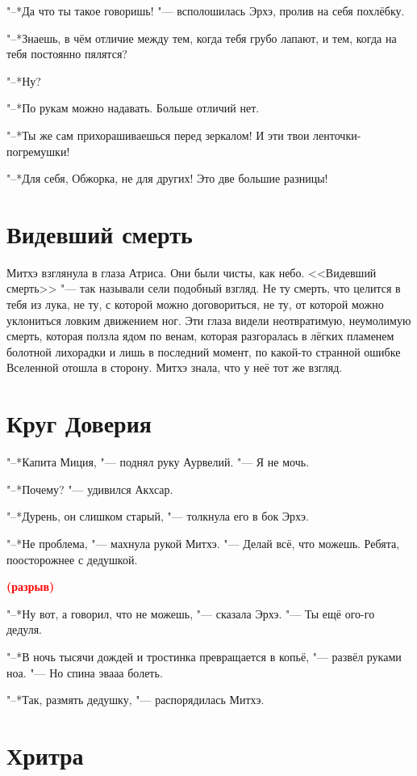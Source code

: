 \documentclass[a4paper,10pt]{book}
\newcommand{\ldotst}{\so{...}\xspace}
\newcommand{\spacing}{\textcolor{red}{\textbf{(разрыв)}}}
\begin{document}
"--*Да что ты такое говоришь! "--- всполошилась Эрхэ, пролив на себя похлёбку.

"--*Знаешь, в чём отличие между тем, когда тебя грубо лапают, и тем, когда на тебя постоянно пялятся?

"--*Ну?

"--*По рукам можно надавать. Больше отличий нет.

"--*Ты же сам прихорашиваешься перед зеркалом! И эти твои ленточки-погремушки!

"--*Для себя, Обжорка, не для других! Это две большие разницы!


\section{Видевший смерть}

Митхэ взглянула в глаза Атриса. Они были чисты, как небо. <<Видевший смерть>> 
"--- так называли сели подобный взгляд. Не ту смерть, что целится в тебя из 
лука, не ту, с которой можно договориться, не ту, от которой можно уклониться 
ловким движением ног. Эти глаза видели неотвратимую, неумолимую смерть, которая 
ползла ядом по венам, которая разгоралась в лёгких пламенем болотной лихорадки 
и 
лишь в последний момент, по какой-то странной ошибке Вселенной отошла в 
сторону. 
Митхэ знала, что у неё тот же взгляд.

\section{Круг Доверия}

"--*Капита Миция, "--- поднял руку Аурвелий. "--- Я не мочь.

"--*Почему? "--- удивился Акхсар.

"--*Дурень, он слишком старый, "--- толкнула его в бок Эрхэ.

"--*Не проблема, "--- махнула рукой Митхэ. "--- Делай всё, что можешь. Ребята, 
поосторожнее с дедушкой.

\spacing

"--*Ну вот, а говорил, что не можешь, "--- сказала Эрхэ. "--- Ты ещё ого-го 
дедуля.

"--*В ночь тысячи дождей и тростинка превращается в копьё, "--- развёл руками 
ноа. "---
Но спина\ldotst эвааа\ldotst болеть.

"--*Так, размять дедушку, "--- распорядилась Митхэ.

\section{Хритра}
\end{document}
